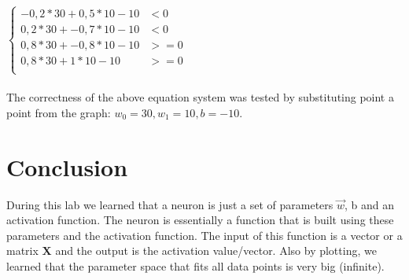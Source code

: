 \documentclass{article}
\begin{document}
        \begin{math}
            \begin{cases}
            -0,2*30 + 0,5*10 - 10 &< 0 \\
            0,2*30 + -0,7*10 - 10 &< 0 \\
            0,8*30 + -0,8*10 - 10 &>= 0 \\
            0,8*30 + 1*10 - 10 &>= 0 \\
            \end{cases}
        \end{math}
        \\
        \\
        The correctness of the above equation system was tested by substituting point a point from the graph: $w_0=30,w_1=10,b=-10$.
    \section{Conclusion}
        During this lab we learned that a neuron is just a set of parameters $\vec{w}$, b and an activation function. The neuron is essentially a function that is built using these parameters and the activation function. The input of this function is a vector or a matrix $\mathbf{X}$ and the output is the activation value/vector. Also by plotting, we learned that the parameter space that fits all data points is very big (infinite).
\end{document}
